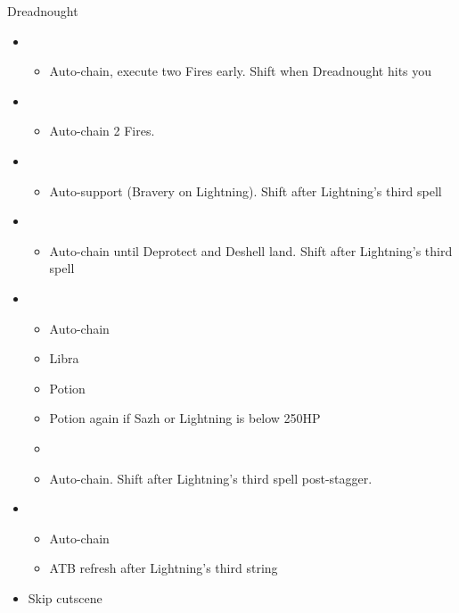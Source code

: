 \begin{paracol}{2}
\begin{battle}{Dreadnought}
		\begin{itemize}
			\item \fourth
			      \begin{itemize}
				      \item Auto-chain, execute two Fires early. Shift when Dreadnought hits you
			      \end{itemize}
			\item \fifth
			      \begin{itemize}
				      \item Auto-chain 2 Fires.
			      \end{itemize}
			\item \sixth
			      \begin{itemize}
				      \item Auto-support (Bravery on Lightning). Shift after Lightning’s third spell
			      \end{itemize}
			\item \fourth
			      \begin{itemize}
				      \item Auto-chain until Deprotect and Deshell land. Shift after Lightning’s third spell
			      \end{itemize}
			\item \fifth
			      \begin{itemize}
				      \item Auto-chain
				      \item Libra
				      \item Potion
				      \item Potion again if Sazh or Lightning is below 250HP
				      \item \stagger
				      \item Auto-chain. Shift after Lightning’s third spell post-stagger.
			      \end{itemize}
			\item \first
			      \begin{itemize}
				      \item Auto-chain
				      \item ATB refresh after Lightning's third string
			      \end{itemize}
			\item Skip cutscene


\end{itemize}
\end{battle}
\end{paracol}
